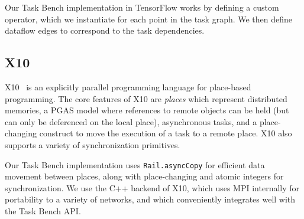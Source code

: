 Our Task Bench implementation in TensorFlow works by defining a custom
operator, which we instantiate for each point in the task graph. We
then define dataflow edges to correspond to the task dependencies.

\subsection{X10}

X10~\cite{X1005} is an explicitly parallel programming language for
place-based programming. The core features of X10 are \emph{places}
which represent distributed memories, a PGAS model where references to
remote objects can be held (but can only be deferenced on the local
place), asynchronous tasks, and a place-changing construct to move the
execution of a task to a remote place. X10 also supports a variety of
synchronization primitives.

Our Task Bench implementation uses
\lstinline[language=X10]{Rail.asyncCopy} for efficient data movement
between places, along with place-changing and atomic integers for
synchronization. We use the C++ backend of X10, which uses MPI
internally for portability to a variety of networks, and which
conveniently integrates well with the Task Bench API.
